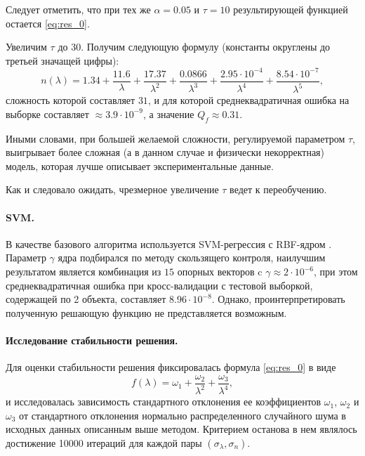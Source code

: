 \documentclass[11pt,a4paper]{article}
\theoremstyle{definition}
\begin{document}
Следует отметить, что при тех же $\alpha = 0.05$ и $\tau = 10$ результирующей функцией остается
\eqref{eq:res_0}.

Увеличим $\tau$ до 30. Получим следующую формулу (константы округлены до третьей значащей цифры):
\begin{equation}
  n(\lambda) = 1.34 + \frac{11.6}{\lambda} + \frac{17.37}{\lambda^2} + \frac{0.0866}{\lambda^3} + \frac{2.95 \cdot 10^{-4}}{\lambda^4} + \frac{8.54 \cdot 10^{-7}}{\lambda^5},
  \label{eq:res_incorrect}
\end{equation}
сложность которой составляет $31$, и для которой среднеквадратичная ошибка
на выборке составляет $\approx 3.9 \cdot 10^{-9}$,
а значение $Q_f \approx 0.31$.

Иными словами, при большей желаемой сложности,
регулируемой параметром $\tau$, выигрывает более сложная (а в данном случае и
физически некорректная) модель, которая лучше описывает экспериментальные данные.

Как и следовало ожидать, чрезмерное увеличение $\tau$ ведет к переобучению.

\paragraph{SVM.}

В качестве базового алгоритма используется SVM-регрессия с RBF-ядром \cite{Vapnik79}.
Параметр $\gamma$ ядра подбирался по методу скользящего контроля, наилучшим результатом является
комбинация из $15$ опорных векторов c $\gamma \approx 2 \cdot 10^{-6}$, при этом
среднеквадратичная ошибка при кросс-валидации с тестовой выборкой, содержащей по 2
объекта, составляет $8.96 \cdot 10^{-8}$. Однако, проинтерпретировать полученную
решающую функцию не представляется возможным.

\paragraph{Исследование стабильности решения.}

Для оценки стабильности решения фиксировалась формула \eqref{eq:res_0} в виде
\[
  f(\lambda) = \omega_1 + \frac{\omega_2}{\lambda^2} + \frac{\omega_3}{\lambda^4},
\]
и исследовалась зависимость стандартного отклонения ее коэффициентов $\omega_1$,
$\omega_2$ и $\omega_3$ от стандартного отклонения
нормально распределенного случайного шума в исходных данных описанным выше методом.
Критерием останова в нем являлось достижение 10000 итераций для каждой пары
$(\sigma_{\lambda}, \sigma_n)$.
\end{document}
